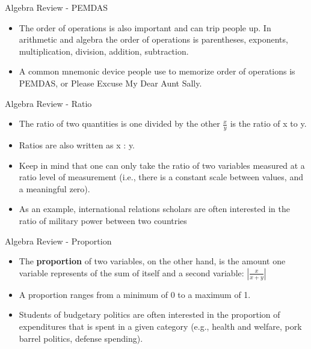 \documentclass[
  ignorenonframetext,
]{beamer}
\begin{document}
\begin{frame}{Algebra Review - PEMDAS}
\protect\hypertarget{algebra-review---pemdas}{}

\begin{itemize}
\item
  The order of operations is also important and can trip people up. In
  arithmetic and algebra the order of operations is parentheses,
  exponents, multiplication, division, addition, subtraction.
\item
  A common mnemonic device people use to memorize order of operations is
  PEMDAS, or Please Excuse My Dear Aunt Sally.
\end{itemize}

\end{frame}

\begin{frame}{Algebra Review - Ratio}
\protect\hypertarget{algebra-review---ratio}{}

\begin{itemize}
\item
  The ratio of two quantities is one divided by the other
  \(\frac{x}{y}\) is the ratio of x to y.
\item
  Ratios are also written as x : y.
\item
  Keep in mind that one can only take the ratio of two variables
  measured at a ratio level of measurement (i.e., there is a constant
  scale between values, and a meaningful zero).
\item
  As an example, international relations scholars are often interested
  in the ratio of military power between two countries
\end{itemize}

\end{frame}

\begin{frame}{Algebra Review - Proportion}
\protect\hypertarget{algebra-review---proportion}{}

\begin{itemize}
\item
  The \textbf{proportion} of two variables, on the other hand, is the
  amount one variable represents of the sum of itself and a second
  variable: \(|\frac{x}{x+y}|\)
\item
  A proportion ranges from a minimum of 0 to a maximum of 1.
\item
  Students of budgetary politics are often interested in the proportion
  of expenditures that is spent in a given category (e.g., health and
  welfare, pork barrel politics, defense spending).
\end{itemize}

\end{frame}
\end{document}

